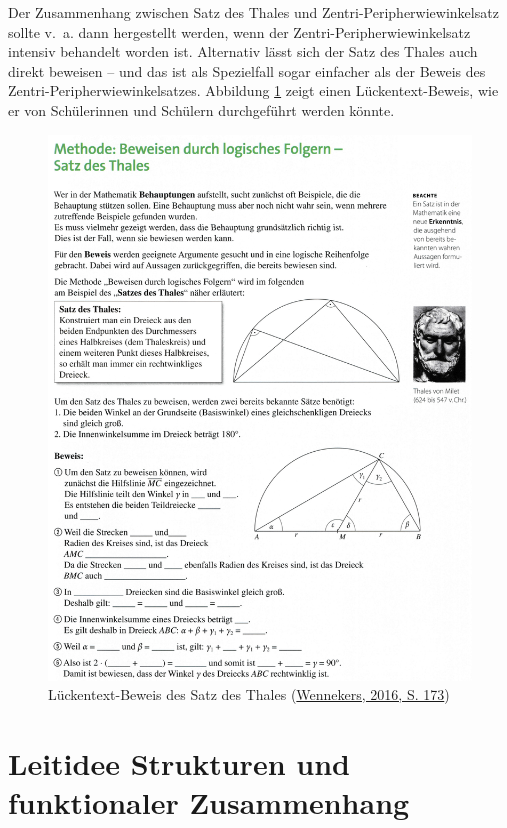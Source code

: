\documentclass[
]{scrbook}
\theoremstyle{definition}
\theoremstyle{definition}
\theoremstyle{definition}
\theoremstyle{definition}
\theoremstyle{remark}
\begin{document}
Der Zusammenhang zwischen Satz des Thales und Zentri-Peripherwiewinkelsatz sollte v.~a. dann hergestellt werden, wenn der Zentri-Peripherwiewinkelsatz intensiv behandelt worden ist. Alternativ lässt sich der Satz des Thales auch direkt beweisen -- und das ist als Spezielfall sogar einfacher als der Beweis des Zentri-Peripherwiewinkelsatzes. Abbildung \ref{fig:ThalesBeweis} zeigt einen Lückentext-Beweis, wie er von Schülerinnen und Schülern durchgeführt werden könnte.



\begin{figure}

{\centering \includegraphics[width=0.75\linewidth]{pictures/12-ThalesBeweis} 

}

\caption{Lückentext-Beweis des Satz des Thales (\protect\hyperlink{ref-Wennekers2016}{Wennekers, 2016, S. 173})}\label{fig:ThalesBeweis}
\end{figure}

\hypertarget{leitidee-strukturen-und-funktionaler-zusammenhang}{%
\chapter{Leitidee Strukturen und funktionaler Zusammenhang}\label{leitidee-strukturen-und-funktionaler-zusammenhang}}
\end{document}
